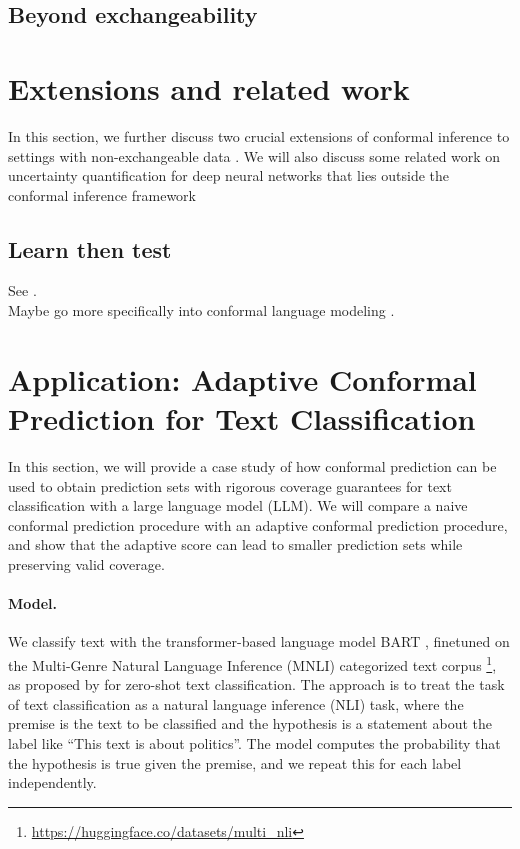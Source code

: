 \documentclass[a4paper, 12pt]{article}
\begin{document}
\subsection*{Beyond exchangeability}

\section{Extensions and related work}
In this section, we further discuss two crucial extensions of conformal inference
to settings with non-exchangeable data \autocite{gibbsAdaptiveConformalInference2021, tibshiraniConformalPredictionCovariate2020}.
We will also discuss some related work on uncertainty quantification for deep neural networks that lies outside the conformal inference framework

\subsection*{Learn then test}
See \autocite{angelopoulosLearnThenTest2022}. \\
Maybe go more specifically into conformal language modeling \autocite{quachConformalLanguageModeling2023}.

\section{Application: Adaptive Conformal Prediction for Text Classification}
In this section, we will provide a case study of how conformal prediction can be used to obtain
prediction sets with rigorous coverage guarantees for text classification with a large language model (LLM). We will
compare a naive conformal prediction procedure with an adaptive conformal prediction procedure, and show that the
adaptive score can lead to smaller prediction sets while preserving valid coverage.

\paragraph*{Model.} We classify text with the transformer-based language model BART \autocite{lewisBARTDenoisingSequencetoSequence2019},
finetuned on the Multi-Genre Natural Language Inference (MNLI) categorized text corpus \footnote{\url{https://huggingface.co/datasets/multi_nli}},
as proposed by \textcite{yinBenchmarkingZeroshotText2019} for zero-shot text classification. The approach is to treat the task of text classification as a natural language inference (NLI) task, where the premise is the text to be classified and the hypothesis is a statement about the label like ``This text is about politics''. The model computes the probability that the hypothesis is true given the premise, and we repeat this for each label independently.
\end{document}

